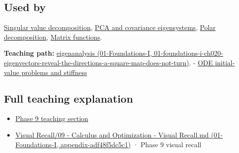 \subsection{Used by}\label{appendix-0b3be18411f9-used-by}

\hyperref[appendix-1fad5e7f36fa]{Singular value decomposition}, \hyperref[appendix-ad175ef3c5bf]{PCA and covariance eigensystems}, \hyperref[appendix-73f5bcf7a462]{Polar decomposition}, \hyperref[appendix-0f4bc2bf2b1f]{Matrix functions}.

\textbf{Teaching path:} \href{../01-Foundations-I/main.pdf\#nameddest=01-foundations-i-ch020-eigenvectors-reveal-the-directions-a-square-map-does-not-turn}{eigenanalysis (01-Foundations-I, 01-foundations-i-ch020-eigenvectors-reveal-the-directions-a-square-map-does-not-turn)}. - \hyperref[appendix-e8ab9836882e]{ODE initial-value problems and stiffness}

\subsection{Full teaching explanation}\label{appendix-0b3be18411f9-full-teaching-explanation}

\begin{itemize}
\tightlist
\item
  \hyperref[02-foundations-ii-ch025-odes-and-numerical-simulation]{Phase 9 teaching section}
\item
  \href{../01-Foundations-I/main.pdf\#nameddest=appendix-adf48f5dc5c1}{Visual Recall/09 - Calculus and Optimization - Visual Recall.md (01-Foundations-I, appendix-adf48f5dc5c1)} · Phase 9 visual recall
\end{itemize}
